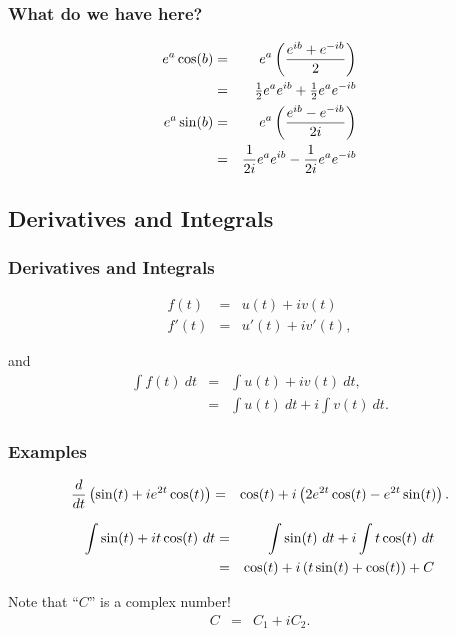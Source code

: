 \begin{frame}
  \frametitle{What do we have here?}

  \begin{eqnarray*}
    e^a \cos(b) & = & e^a \left( \frac{e^{ib}+e^{-ib}}{2} \right) \\
    & = & \mbox{$\frac{1}{2}$} e^a e^{ib} +\mbox{$\frac{1}{2}$} e^a  e^{-ib} \\
    e^a \sin(b) & = & e^a \left( \frac{e^{ib}-e^{-ib}}{2i} \right) \\
    & = & \frac{1}{2i} e^a e^{ib} - \frac{1}{2i} e^a e^{-ib}
  \end{eqnarray*}

\end{frame}

\subsection{Derivatives and Integrals}

\begin{frame}
  \frametitle{Derivatives and Integrals}

  \begin{eqnarray*}
    f(t) & = & u(t) + i v(t) \\
    f'(t) & = & u'(t) + i v'(t),
  \end{eqnarray*}

  and
  \begin{eqnarray*}
    \int f(t) ~ dt & = & \int u(t) + i v(t) ~ dt, \\
    & = & \int u(t) ~ dt + i \int v(t) ~ dt.
  \end{eqnarray*}

\end{frame}


\begin{frame}
  \frametitle{Examples}

  \begin{eqnarray*}
    \frac{d}{dt} \left( \sin(t) + i e^{2t} \cos(t) \right) & = & 
    \cos(t) + i \left( 2 e^{2t} \cos(t) - e^{2t} \sin(t) \right).
  \end{eqnarray*}

  \begin{eqnarray*}
    \int \sin(t) + i t \cos(t) ~ dt & = & 
    \int \sin(t) ~ dt + i \int t \cos(t) ~ dt \\
    & = & \cos(t) + i \left( t\sin(t) + \cos(t) \right) + C
  \end{eqnarray*}

  Note that ``$C$'' is a complex number!
  \begin{eqnarray*}
    C & = & C_1 + i C_2.
  \end{eqnarray*}

\end{frame}

